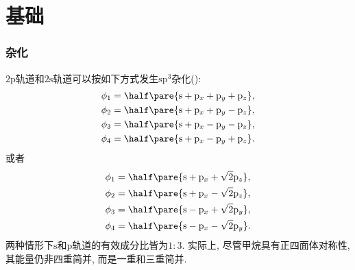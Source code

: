 \documentclass[hidelinks]{ctexart}
\begin{document}
\section{基础} %
\label{sec:基础}

\label{sub:huckel的相关工作}

\subsubsection{杂化} %
\label{ssub:杂化}

$\mathrm{2p}$轨道和$\mathrm{2s}$轨道可以按如下方式发生$\mathrm{sp^3}$杂化():
\begin{align*}
    \phi_1 &= \half \pare{\mathrm{s} + \mathrm{p}_x + \mathrm{p}_y + \mathrm{p}_z}, \\
    \phi_2 &= \half \pare{\mathrm{s} + \mathrm{p}_x + \mathrm{p}_y - \mathrm{p}_z}, \\
    \phi_3 &= \half \pare{\mathrm{s} + \mathrm{p}_x - \mathrm{p}_y - \mathrm{p}_z}, \\
    \phi_4 &= \half \pare{\mathrm{s} + \mathrm{p}_x - \mathrm{p}_y + \mathrm{p}_z}.
\end{align*}
或者
\begin{align*}
    \phi_1 &= \half \pare{\mathrm{s} + \mathrm{p}_x + \sqrt{2}\mathrm{p}_z}, \\
    \phi_2 &= \half \pare{\mathrm{s} + \mathrm{p}_x - \sqrt{2}\mathrm{p}_z}, \\
    \phi_3 &= \half \pare{\mathrm{s} - \mathrm{p}_x + \sqrt{2}\mathrm{p}_y}, \\
    \phi_4 &= \half \pare{\mathrm{s} - \mathrm{p}_x - \sqrt{2}\mathrm{p}_y}.
\end{align*}
两种情形下$\mathrm{s}$和$\mathrm{p}$轨道的有效成分比皆为$1:3$. 实际上, 尽管甲烷具有正四面体对称性, 其能量仍非四重简并, 而是一重和三重简并.


\label{ssub:简单Huckel理论}
\end{document}
